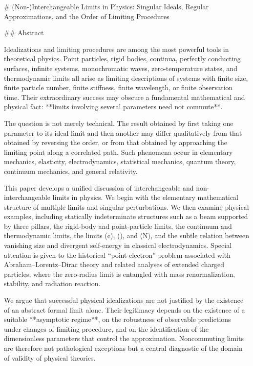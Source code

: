 
# (Non-)Interchangeable Limits in Physics: Singular Ideals, Regular Approximations, and the Order of Limiting Procedures

## Abstract

Idealizations and limiting procedures are among the most powerful tools in theoretical physics. Point particles, rigid bodies, continua, perfectly conducting surfaces, infinite systems, monochromatic waves, zero-temperature states, and thermodynamic limits all arise as limiting descriptions of systems with finite size, finite particle number, finite stiffness, finite wavelength, or finite observation time. Their extraordinary success may obscure a fundamental mathematical and physical fact: **limits involving several parameters need not commute**.

The question is not merely technical. The result obtained by first taking one parameter to its ideal limit and then another may differ qualitatively from that obtained by reversing the order, or from that obtained by approaching the limiting point along a correlated path. Such phenomena occur in elementary mechanics, elasticity, electrodynamics, statistical mechanics, quantum theory, continuum mechanics, and general relativity.

This paper develops a unified discussion of interchangeable and non-interchangeable limits in physics. We begin with the elementary mathematical structure of multiple limits and singular perturbations. We then examine physical examples, including statically indeterminate structures such as a beam supported by three pillars, the rigid-body and point-particle limits, the continuum and thermodynamic limits, the limits (c\to\infty), (\hbar{}), and (N\to\infty), and the subtle relation between vanishing size and divergent self-energy in classical electrodynamics. Special attention is given to the historical ``point electron'' problem associated with Abraham--Lorentz--Dirac theory and related analyses of extended charged particles, where the zero-radius limit is entangled with mass renormalization, stability, and radiation reaction.

We argue that successful physical idealizations are not justified by the existence of an abstract formal limit alone. Their legitimacy depends on the existence of a suitable **asymptotic regime**, on the robustness of observable predictions under changes of limiting procedure, and on the identification of the dimensionless parameters that control the approximation. Noncommuting limits are therefore not pathological exceptions but a central diagnostic of the domain of validity of physical theories.

